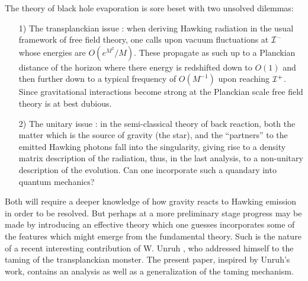 \documentclass[12pt]{article}
\begin{document}
The theory of black hole evaporation \cite{Hawk} is sore beset with two unsolved
dilemmas: \begin{itemize}
\item[1)] The transplanckian issue \cite{THooft}\cite{Jacobson1}: when deriving
Hawking radiation in the usual framework of free field theory, one calls upon
vacuum fluctuations at $ {\cal I}^-$ \cite{EMP}\cite{MaPa} 
whose energies are $ O (e^{M^2} / M)$.
These propagate as such up to a Planckian distance of 
the horizon where there
energy is redshifted down to $O(1)$ and then further 
down to a typical frequency of $ O (M^{-1})$ upon reaching
$ {\cal
I}^+$.
Since gravitational interactions become strong at the
Planckian scale free field theory is at best dubious.

\item[2)] The unitary issue \cite{Hawk3}:  in the semi-classical theory of back
reaction, both the matter which is the source of gravity (the star), and the
``partners'' to the emitted Hawking photons fall into the singularity, giving
rise to a density matrix description of the radiation, thus, in the last
analysis, to a non-unitary description of the evolution. Can one incorporate
such a quandary into quantum mechanics?

\end{itemize}



\noindent Both will require a deeper knowledge of how gravity reacts to Hawking
emission in order to be resolved. But perhaps at a more preliminary stage
progress may be made by introducing an effective theory which one guesses
incorporates some of the features which might emerge from the fundamental
theory. Such is the nature of a recent interesting contribution of W.
Unruh \cite{Un94}, who addressed himself to the taming of the transplanckian monster.
The present paper, inspired by Unruh's work, contains an analysis as well as a
generalization of the taming mechanism.
\end{document}
